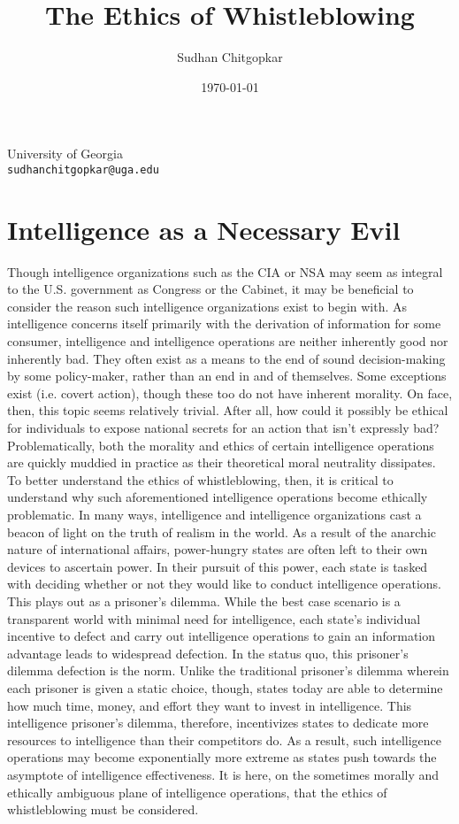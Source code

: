 \documentclass [12 pt] {article}
\title {The Ethics of Whistleblowing}
\author {Sudhan Chitgopkar}
\date {\today}
\begin{document}
\maketitle
\vspace{4.25 in}
\begin {center}
  University of Georgia \\ \texttt{sudhanchitgopkar@uga.edu}
\end {center}
\newpage
\tableofcontents
\newpage
\section {Intelligence as a Necessary Evil}
Though intelligence organizations such as the CIA or NSA may seem as integral to the U.S. government as Congress or the Cabinet, it may be beneficial to consider the reason such intelligence organizations exist to begin with. As intelligence concerns itself primarily with the derivation of information for some consumer, intelligence and intelligence operations are neither inherently good nor inherently bad. They often exist as a means to the end of sound decision-making by some policy-maker, rather than an end in and of themselves. Some exceptions exist (i.e. covert action), though these too do not have inherent morality. On face, then, this topic seems relatively trivial. After all, how could it possibly be ethical for individuals to expose national secrets for an action that isn't expressly bad? Problematically, both the morality and ethics of certain intelligence operations are quickly muddied in practice as their theoretical moral neutrality dissipates. To better understand the ethics of whistleblowing, then, it is critical to understand why such aforementioned intelligence operations become ethically problematic.
\bigbreak
In many ways, intelligence and intelligence organizations cast a beacon of light on the truth of realism in the world. As a result of the anarchic nature of international affairs, power-hungry states are often left to their own devices to ascertain power. In their pursuit of this power, each state is tasked with deciding whether or not they would like to conduct intelligence operations. This plays out as a prisoner's dilemma. While the best case scenario is a transparent world with minimal need for intelligence, each state's individual incentive to defect and carry out intelligence operations to gain an information advantage leads to widespread defection. In the status quo, this prisoner's dilemma defection is the norm. Unlike the traditional prisoner's dilemma wherein each prisoner is given a static choice, though, states today are able to determine how much time, money, and effort they want to invest in intelligence. This intelligence prisoner's dilemma, therefore, incentivizes states to dedicate more resources to intelligence than their competitors do. As a result, such intelligence operations may become exponentially more extreme as states push towards the asymptote of intelligence effectiveness. It is here, on the sometimes morally and ethically ambiguous plane of intelligence operations, that the ethics of whistleblowing must be considered.
\end{document}
